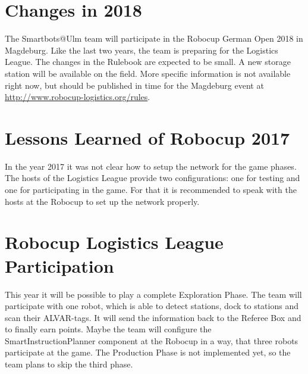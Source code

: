 \section{Changes in 2018}

The Smartbots@Ulm team will participate in the Robocup German Open 2018 in Magdeburg. Like the last two years, the team is preparing for the Logistics League. The changes in the Rulebook are expected to be small. A new storage station will be available on the field. More specific information is not available right now, but should be published in time for the Magdeburg event at \url{http://www.robocup-logistics.org/rules}.


\section{Lessons Learned of Robocup 2017}

In the year 2017 it was not clear how to setup the network for the game phases. The hosts of the Logistics League provide two configurations: one for testing and one for participating in the game. For that it is recommended to speak with the hosts at the Robocup to set up the network properly.


\section{Robocup Logistics League Participation}

This year it will be possible to play a complete Exploration Phase. The team will participate with one robot, which is able to detect stations, dock to stations and scan their ALVAR-tags. It will send the information back to the Referee Box and to finally earn points. Maybe the team will configure the SmartInstructionPlanner component at the Robocup in a way, that three robots participate at the game. The Production Phase is not implemented yet, so the team plans to skip the third phase.
